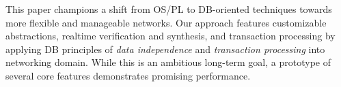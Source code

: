 \vspace{-.5em}
\label{sec:conclusion}

This paper champions a shift from OS/PL to DB-oriented techniques
towards more flexible and manageable networks. Our \Sys approach
features customizable abstractions, realtime verification and
synthesis, and transaction processing by applying DB principles of
\textit{data independence} and \textit{transaction processing} into
networking domain. %
While this is an ambitious long-term goal, a prototype of several core
features demonstrates promising performance.
